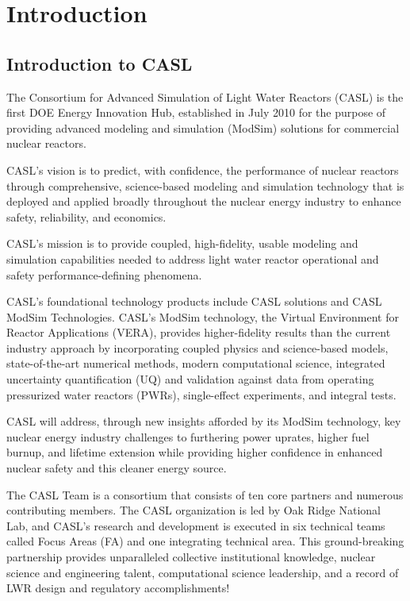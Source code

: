 \documentclass{report}
\numberwithin{equation}{section}
\begin{document}
\chapter{Introduction}

\section{Introduction to CASL}
The Consortium for Advanced Simulation of Light Water Reactors (CASL) is the first
DOE Energy Innovation Hub, established in July 2010 for the purpose of providing
advanced modeling and simulation (ModSim) solutions for commercial nuclear reactors.

CASL's vision is to predict, with confidence, the performance of nuclear reactors
through comprehensive, science-based modeling and simulation technology that is
deployed and applied broadly throughout the nuclear energy industry to enhance safety,
reliability, and economics.

CASL's mission is to provide coupled, high-fidelity, usable modeling and simulation
capabilities needed to address light water reactor operational and safety performance-defining phenomena.

CASL's foundational technology products include CASL solutions and CASL ModSim Technologies.
CASL's ModSim technology, the Virtual Environment for Reactor Applications (VERA), provides
higher-fidelity results than the current industry approach by incorporating coupled physics
and science-based models, state-of-the-art numerical methods, modern computational science,
integrated uncertainty quantification (UQ) and validation against data from operating
pressurized water reactors (PWRs), single-effect experiments, and integral tests.

CASL will address, through new insights afforded by its ModSim technology, key nuclear
energy industry challenges to furthering power uprates, higher fuel burnup, and lifetime
extension while providing higher confidence in enhanced nuclear safety and this cleaner energy source.

The CASL Team is a consortium that consists of ten core partners and numerous contributing members.
The CASL organization is led by Oak Ridge National Lab, and CASL's research and development is executed
in six technical teams called Focus Areas (FA) and one integrating technical area.
This ground-breaking partnership provides unparalleled
collective institutional knowledge, nuclear science and engineering talent, computational
science leadership, and a record of LWR design and regulatory accomplishments!
\end{document}
